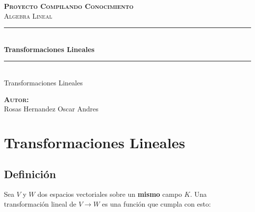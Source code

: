 \documentclass[12pt]{report}                                %
\author{Oscar Andrés Rosas}                                 %
\begin{document}
\begin{titlepage}

    \center
    \textbf{\textsc{\Large Proyecto Compilando Conocimiento}}\\[1.0cm] 
    \textsc{\Large Algebra Lineal}\\[1.0cm] 

    \rule{\linewidth}{0.5mm} \\[1.0cm]
        { \huge \bfseries Transformaciones Lineales}\\[1.0cm] 
    \rule{\linewidth}{0.5mm} \\[2.0cm]
    
    {\LARGE Transformaciones Lineales}\\[7cm] 
    
    \begin{center} \large
    \textbf{\textsc{Autor:}}\\
    Rosas Hernandez Oscar Andres
    \end{center}

    \vfill

\end{titlepage}


\tableofcontents{}
\clearpage

\chapter{Transformaciones Lineales}
    \clearpage

    \section{Definición}
        Sea $V$ y $W$ dos espacios vectoriales sobre un \textbf{mismo} campo $K$. Una
        transformación lineal de $V \to W$ es una función que cumpla con esto:
\end{document}
